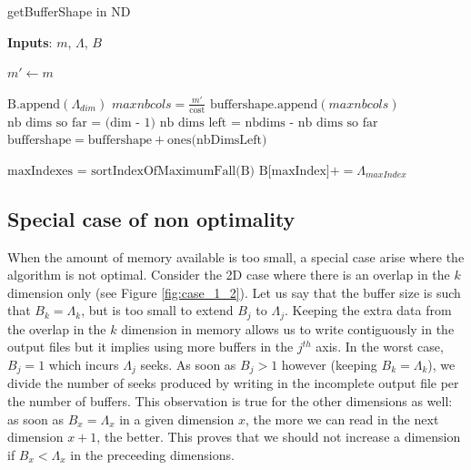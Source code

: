 \documentclass[conference]{IEEEtran}
\begin{document}
\begin{algorithm}[h]
  \caption{getBufferShape in ND}

  \begin{algorithmic}[1]

    \STATE \textbf{Inputs}: $m$, $\Lambda$, $B$

    \STATE $m' \gets m$

        \STATE $\textrm{B.append}(\Lambda_{dim})$
      \ENDIF
        \STATE $maxnbcols = \frac{m'}{\textrm{cost}}$
	      \STATE $\textrm{buffershape.append}(maxnbcols)$
      \ENDIF
        \STATE $\textrm{nb dims so far = (dim - 1)}$
        \STATE $\textrm{nb dims left = nbdims - nb dims so far}$
        \STATE $\textrm{buffershape} = \textrm{buffershape} + \textrm{ones(nbDimsLeft)}$
      \ENDIF
    \ENDFOR

    \STATE $\textrm{maxIndexes = sortIndexOfMaximumFall(B)}$ %
        \STATE $\textrm{B[maxIndex]} += \Lambda_{maxIndex}$
      \ENDWHILE
    \ENDFOR

  \end{algorithmic}
  \label{algo:getbuffershape}

\end{algorithm}

\subsection{Special case of non optimality}
When the amount of memory available is too small, a special case arise where the algorithm is not optimal.
Consider the 2D case where there is an overlap in the $k$ dimension only (see Figure \ref{fig:case_1_2}).
Let us say that the buffer size is such that $B_k = \Lambda_k$, but is too small to extend $B_j$ to $\Lambda_j$.
Keeping the extra data from the overlap in the $k$ dimension in memory allows us to write contiguously in the output files but it implies using more buffers in the $j^{th}$ axis.
In the worst case, $B_j = 1$ which incurs $\Lambda_j$ seeks.
As soon as $B_j > 1$ however (keeping $B_k = \Lambda_k$), we divide the number of seeks produced by writing in the incomplete output file per the number of buffers.
This observation is true for the other dimensions as well: as soon as $B_x = \Lambda_x$ in a given dimension $x$, the more we can read in the next dimension $x+1$, the better.
This proves that we should not increase a dimension if $B_x < \Lambda_x$ in the preceeding dimensions.
\end{document}
